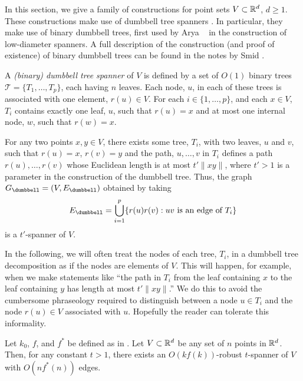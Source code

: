 \documentclass{cccg12}
\begin{document}
In this section, we give a family of constructions for point sets
$V\subset\mathbb{R}^d$, $d\ge 1$.  These constructions make use of dumbbell
tree spanners \cite[Chapter~11]{ns07}.  In particular, they make use
of binary dumbbell trees, first used by Arya \etal\ \cite{admss95} in
the construction of low-diameter spanners.  A full description of the
construction (and proof of existence) of binary dumbbell trees can be
found in the notes by Smid \cite{s12}.

A \emph{(binary) dumbbell tree spanner} of $V$ is defined by a set of
$O(1)$ binary trees $\mathcal{T}=\{T_1,\ldots,T_p\}$, each having $n$
leaves.  Each node, $u$, in each of these trees is associated with one
element, $r(u)\in V$.  For each $i\in\{1,\ldots,p\}$, and each $x\in V$,
$T_i$ contains exactly one leaf, $u$, such that $r(u)=x$ and at most
one internal node, $w$, such that $r(w)=x$.

For any two points $x,y\in V$, there exists some tree, $T_i$,
with two leaves, $u$ and $v$, such that $r(u)=x$, $r(v)=y$ and
the path, $u,\ldots,v$ in $T_i$ defines a path $r(u),\ldots,r(v)$
whose Euclidean length is at most $t'\|xy\|$, where $t'>1$ is a
parameter in the construction of the dumbbell tree.  Thus, the graph
$G_\dumbbell=(V,E_\dumbbell)$ obtained by taking
\[
   E_\dumbbell = \bigcup_{i=1}^p\{r(u)r(v) : \text{$uv$ is an edge of $T_i$} \}
\]
is a $t'$-spanner of $V$.  

In the following, we will often treat the nodes of each tree, $T_i$,
in a dumbbell tree decomposition as if the nodes are elements of $V$.
This will happen, for example, when we make statements like ``the path in
$T_i$ from the leaf containing $x$ to the leaf containing $y$ has length
at most $t'\|xy\|$.''  We do this to avoid the cumbersome phraseology
required to distinguish between a node $u\in T_i$ and the node $r(u)\in V$
associated with $u$.  Hopefully the reader can tolerate this informality.

\begin{thm}
  Let $k_0$, $f$, and $f^*$ be defined as in .
  Let $V\subset \mathbb{R}^d$ be any set of $n$ points in $\mathbb{R}^d$.  Then, for any
  constant $t>1$,  there exists an $O(kf(k))$-robust $t$-spanner of $V$
  with $O(nf^*(n))$ edges.
\end{thm}
\end{document}
